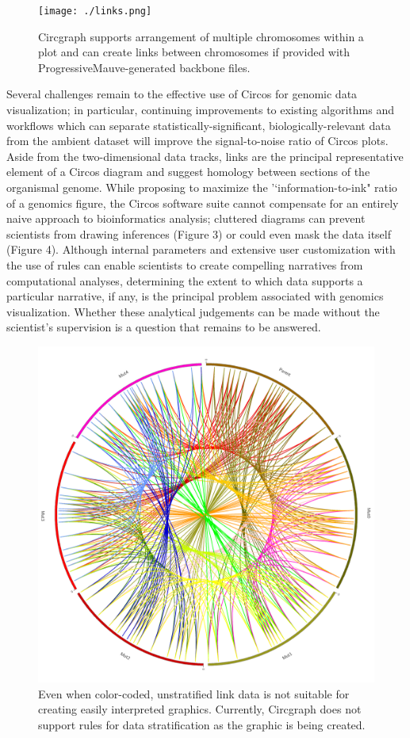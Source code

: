 \documentclass[twocolumn]{article}
\begin{document}
\begin{figure}
\centering
\texttt{[image: ./links.png]}
\caption{Circgraph supports arrangement of multiple chromosomes within a plot and can create links between chromosomes if provided with ProgressiveMauve-generated backbone files.}
\end{figure}

Several challenges remain to the effective use of Circos for genomic data visualization; in particular, continuing improvements to existing algorithms and workflows which can separate statistically-significant, biologically-relevant data from the ambient dataset will improve the signal-to-noise ratio of Circos plots. Aside from the two-dimensional data tracks, links are the principal representative element of a Circos diagram and suggest homology between sections of the organismal genome. While proposing to maximize the '`information-to-ink" ratio of a genomics figure, the Circos software suite cannot compensate for an entirely naive approach to bioinformatics analysis; cluttered diagrams can prevent scientists from drawing inferences (Figure 3) or could even mask the data itself (Figure 4).\cite{circospaper} Although internal parameters and extensive user customization with the use of rules can enable scientists to create compelling narratives from computational analyses, determining the extent to which data supports a particular narrative, if any, is the principal problem associated with genomics visualization. Whether these analytical judgements can be made without the scientist's supervision is a question that remains to be answered.

\begin{figure}
\centering
\includegraphics[scale=0.1]{./Generated_Data_Non_Ribbon.png}
\caption{Even when color-coded, unstratified link data is not suitable for creating easily interpreted graphics. Currently, Circgraph does not support rules for data stratification as the graphic is being created.}
\end{figure}
\end{document}

